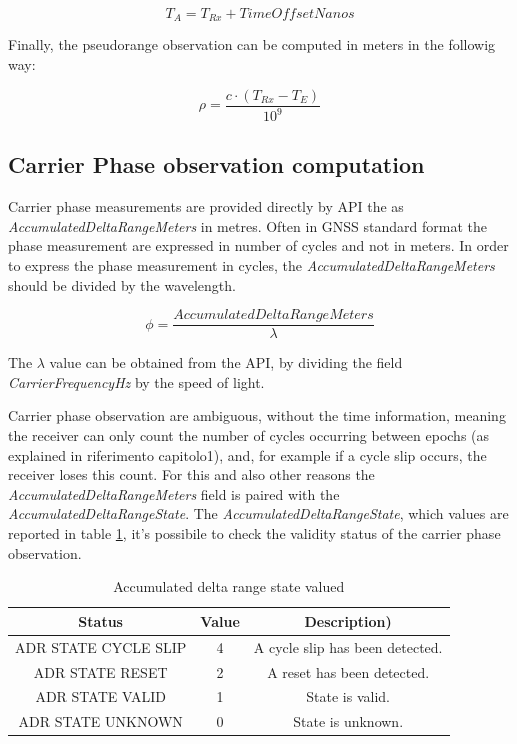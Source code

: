 \begin{equation}
	T_{A} =  T_{Rx} + TimeOffsetNanos
	\label{eq:Ta_android}
\end{equation}

Finally, the pseudorange observation can be computed in meters in the followig way:

\begin{equation}
	\rho = \frac{ c \cdot (T_{Rx}-T_{E})}{10^{9}}
	\label{eq:pseudorange_android}
\end{equation}

\subsection{Carrier Phase observation computation}

Carrier phase measurements are provided directly by API the  as \textit{AccumulatedDeltaRangeMeters} in metres. Often in GNSS standard format the phase measurement are expressed in number of cycles and not in meters. In order to express the phase measurement in cycles, the \textit{AccumulatedDeltaRangeMeters} should be divided by the wavelength.

\begin{equation}
	\phi = \frac{AccumulatedDeltaRangeMeters}{\lambda}
	\label{eq:phase_cycles}
\end{equation}

The $\lambda$ value can be obtained from the API, by dividing the field \textit{CarrierFrequencyHz} by the speed of light.
 
Carrier phase observation are ambiguous, without the time information, meaning the receiver can only count the number of cycles occurring between epochs (as explained in riferimento capitolo1), and, for example if a cycle slip occurs, the receiver loses this count. For this and also other reasons the \textit{AccumulatedDeltaRangeMeters} field is paired with the \textit{AccumulatedDeltaRangeState}. The \textit{AccumulatedDeltaRangeState}, which values are reported in table \ref{tab:adr_state}, it's possibile to check the validity status of the carrier phase observation.

\begin{table}[h]
	\centering

	\begin{tabular}{| c | c| c|}
		\hline
		\textbf{Status} & \textbf{Value} & \textbf{Description)}\\
		\hline 
		ADR STATE CYCLE SLIP & 4 & A cycle slip has been detected.\\
		\hline
		ADR STATE RESET & 2 & A reset has been detected.\\
		\hline
		ADR STATE VALID & 1 & State is valid.\\     
		\hline	
		ADR STATE UNKNOWN & 0 & State is unknown.\\     
		\hline
	\end{tabular}
\caption{Accumulated delta range state valued}
\label{tab:adr_state}
\end{table}

